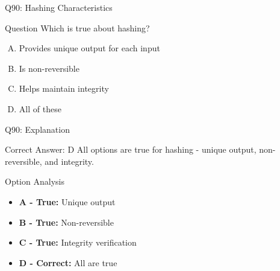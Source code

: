 \documentclass{beamer}
\begin{document}
	\begin{frame}{Q90: Hashing Characteristics}
		\begin{block}{Question}
			Which is true about hashing?
		\end{block}
		\begin{enumerate}[(A)]
			\item Provides unique output for each input
			\item Is non-reversible
			\item Helps maintain integrity
			\item All of these
		\end{enumerate}
	\end{frame}
	
	\begin{frame}{Q90: Explanation}
		\begin{block}{Correct Answer: D}
			All options are true for hashing - unique output, non-reversible, and integrity.
		\end{block}
		\begin{block}{Option Analysis}
			\begin{itemize}
				\item \textbf{A - True:} Unique output
				\item \textbf{B - True:} Non-reversible
				\item \textbf{C - True:} Integrity verification
				\item \textbf{D - Correct:} All are true
			\end{itemize}
		\end{block}
	\end{frame}
	
	
	
\end{document}
